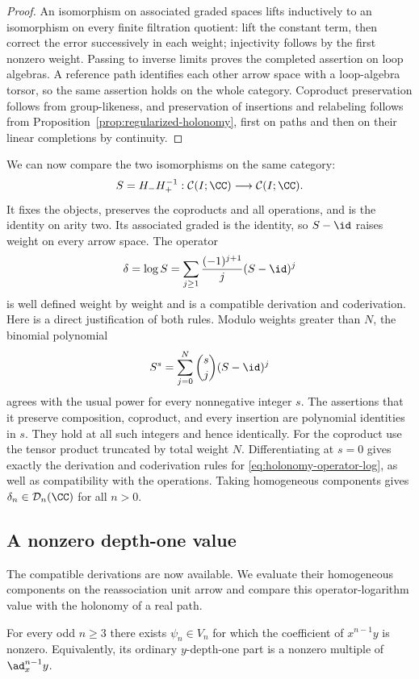 \begin{proof}
An isomorphism on associated graded spaces lifts inductively to an
isomorphism on every finite filtration quotient: lift the constant
term, then correct the error successively in each weight; injectivity
follows by the first nonzero weight.  Passing to inverse limits proves
the completed assertion on loop algebras.  A reference path identifies
each other arrow space with a loop-algebra torsor, so the same assertion
holds on the whole category.  Coproduct preservation follows from
group-likeness, and preservation of insertions and relabeling follows
from Proposition~\ref{prop:regularized-holonomy}, first on paths and
then on their linear completions by continuity.
\end{proof}

We can now compare the two isomorphisms on the same category:
\[
 S=H_-H_+^{-1}:\mathcal C(I;\CC)\longrightarrow\mathcal C(I;\CC).
\]
It fixes the objects, preserves the coproducts and all operations,
and is the identity on arity two.  Its associated graded is the
identity, so $S-\id$ raises weight on every arrow space.  The operator
\begin{equation}\label{eq:holonomy-operator-log}
 \delta=\log S=
 \sum_{j\geq1}\frac{(-1)^{j+1}}j(S-\id)^j
\end{equation}
is well defined weight by weight and is a compatible derivation and
coderivation.  Here is a direct justification of both rules.  Modulo
weights greater than $N$, the binomial polynomial
\[
 S^s=\sum_{j=0}^{N}\binom{s}{j}(S-\id)^j
\]
agrees with the usual power for every nonnegative integer $s$.
The assertions that it preserve composition, coproduct, and every
insertion are polynomial identities in $s$.  They hold at all such
integers and hence identically.  For the coproduct use the tensor
product truncated by total weight $N$.  Differentiating at $s=0$
gives exactly the derivation and coderivation rules for
\eqref{eq:holonomy-operator-log}, as well as compatibility with the
operations.  Taking homogeneous components gives
$\delta_n\in\mathcal D_n(\CC)$ for all $n>0$.

\subsection{A nonzero depth-one value}
The compatible derivations are now available.  We evaluate their
homogeneous components on the reassociation unit arrow and compare
this operator-logarithm value with the holonomy of a real path.

\begin{proposition}\label{prop:odd-depth-one}
For every odd $n\geq3$ there exists $\psi_n\in V_n$ for which the
coefficient of $x^{n-1}y$ is nonzero.  Equivalently, its ordinary
$y$-depth-one part is a nonzero multiple of $\ad_x^{n-1}y$.
\end{proposition}


